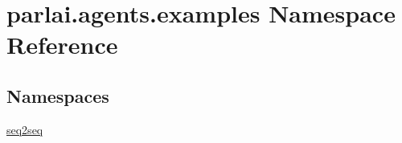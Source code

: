 \hypertarget{namespaceparlai_1_1agents_1_1examples}{}\section{parlai.\+agents.\+examples Namespace Reference}
\label{namespaceparlai_1_1agents_1_1examples}
\subsection*{Namespaces}
\begin{DoxyCompactItemize}
\item 
 \hyperlink{namespaceparlai_1_1agents_1_1examples_1_1seq2seq}{seq2seq}
\end{DoxyCompactItemize}
